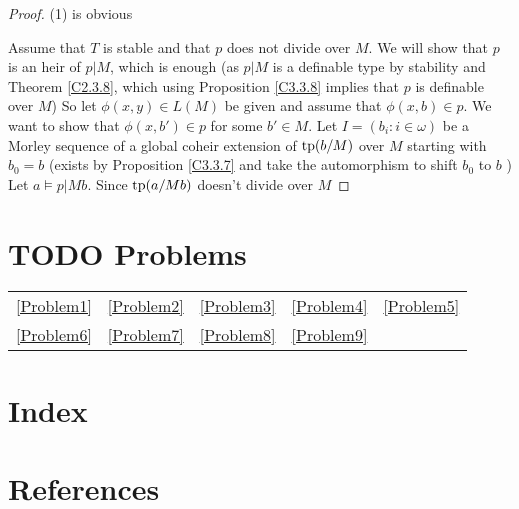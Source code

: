 \documentclass[11pt]{article}
\begin{document}
\begin{proof}
(1) is obvious

Assume that \(T\) is stable and that \(p\) does not divide over \(M\).
We will show that \(p\) is an heir of \(p|M\), which is enough (as \(p|M\) is a definable type
by stability and Theorem \ref{C2.3.8}, which using Proposition \ref{C3.3.8} implies that \(p\) is
definable over \(M\))
So let \(\phi(x,y)\in L(M)\) be given and assume that \(\phi(x,b)\in p\). We want to show
that \(\phi(x,b')\in p\) for some \(b'\in M\).
Let \(I=(b_i:i\in\omega)\) be a Morley sequence of a global coheir extension of \(\operatorname{tp}(b/M)\) over \(M\)
starting with \(b_0=b\) (exists by Proposition \ref{C3.3.7} and take the automorphism to
shift \(b_0\) to \(b\) )
Let \(a\vDash p|Mb\). Since \(\operatorname{tp}(a/Mb)\) doesn't divide over \(M\)
\end{proof}


\section{{\bfseries\sffamily TODO} Problems}
\label{sec:orgdbb134b}
\begin{center}
\begin{tabular}{lllll}
\ref{Problem1} & \ref{Problem2} & \ref{Problem3} & \ref{Problem4} & \ref{Problem5}\\
\ref{Problem6} & \ref{Problem7} & \ref{Problem8} & \ref{Problem9} & \\
\end{tabular}
\end{center}

\section{Index}
\label{sec:org55670e3}

\renewcommand{\indexname}{}
\printindex

\section{References}
\label{sec:org36ef185}

\label{bibliographystyle link}


\label{bibliography link}

\end{document}
